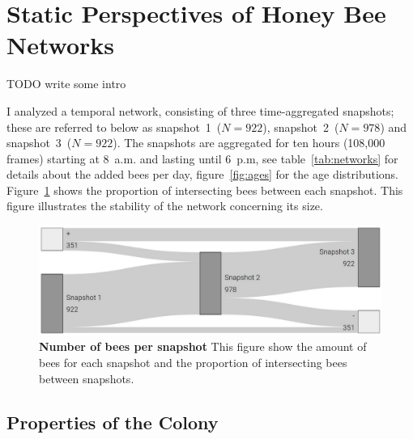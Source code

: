\section{Static Perspectives of Honey Bee Networks}

TODO write some intro

I analyzed a temporal network, consisting of three time-aggregated snapshots; these are referred to below as snapshot~1~($N=922$), snapshot~2~($N=978$) and snapshot~3~($N=922$). 
The snapshots are aggregated for ten hours (108,000 frames) starting at 8~a.m. and lasting until 6~p.m, see table~\ref{tab:networks} for details about the added bees per day,  figure~\ref{fig:ages} for the age distributions. Figure~\ref{fig:network-matching} shows the proportion of intersecting bees between each snapshot. This figure illustrates the stability of the network concerning its size. 



\begin{figure}[htb]
	\centering
	\includegraphics[width=.8\textwidth]{Figures/network_matching}
	\caption[Number of bees per snapshot]{\textbf{Number of bees per snapshot} This figure show the amount of bees for each snapshot and the proportion of intersecting bees between snapshots.}
	\label{fig:network-matching}
\end{figure}

\subsection{Properties of the Colony}

\clearpage


